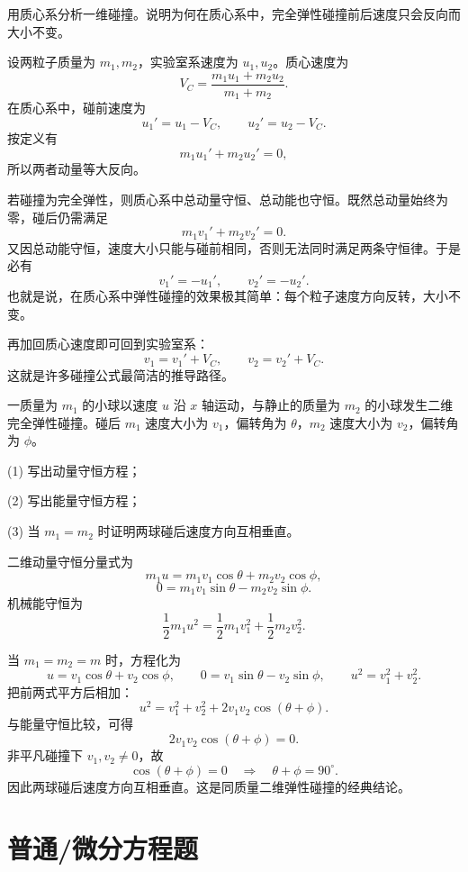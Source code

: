 \begin{university}
用质心系分析一维碰撞。说明为何在质心系中，完全弹性碰撞前后速度只会反向而大小不变。

\begin{solution}
设两粒子质量为 $m_1,m_2$，实验室系速度为 $u_1,u_2$。质心速度为
\[
V_C=\frac{m_1u_1+m_2u_2}{m_1+m_2}.
\]
在质心系中，碰前速度为
\[
u_1'=u_1-V_C,
\qquad
u_2'=u_2-V_C.
\]
按定义有
\[
m_1u_1'+m_2u_2'=0,
\]
所以两者动量等大反向。

若碰撞为完全弹性，则质心系中总动量守恒、总动能也守恒。既然总动量始终为零，碰后仍需满足
\[
m_1v_1'+m_2v_2'=0.
\]
又因总动能守恒，速度大小只能与碰前相同，否则无法同时满足两条守恒律。于是必有
\[
v_1'=-u_1',
\qquad
v_2'=-u_2'.
\]
也就是说，在质心系中弹性碰撞的效果极其简单：每个粒子速度方向反转，大小不变。

再加回质心速度即可回到实验室系：
\[
v_1=v_1'+V_C,
\qquad
v_2=v_2'+V_C.
\]
这就是许多碰撞公式最简洁的推导路径。
\end{solution}
\end{university}

\begin{university}
一质量为 $m_1$ 的小球以速度 $u$ 沿 $x$ 轴运动，与静止的质量为 $m_2$ 的小球发生二维完全弹性碰撞。碰后 $m_1$ 速度大小为 $v_1$，偏转角为 $\theta$，$m_2$ 速度大小为 $v_2$，偏转角为 $\phi$。

(1) 写出动量守恒方程；

(2) 写出能量守恒方程；

(3) 当 $m_1=m_2$ 时证明两球碰后速度方向互相垂直。

\begin{solution}
二维动量守恒分量式为
\[
m_1u=m_1v_1\cos\theta+m_2v_2\cos\phi,
\]
\[
0=m_1v_1\sin\theta-m_2v_2\sin\phi.
\]
机械能守恒为
\[
\frac12 m_1u^2=\frac12 m_1v_1^2+\frac12 m_2v_2^2.
\]

当 $m_1=m_2=m$ 时，方程化为
\[
u=v_1\cos\theta+v_2\cos\phi,
\qquad
0=v_1\sin\theta-v_2\sin\phi,
\qquad
u^2=v_1^2+v_2^2.
\]
把前两式平方后相加：
\[
u^2=v_1^2+v_2^2+2v_1v_2\cos(\theta+\phi).
\]
与能量守恒比较，可得
\[
2v_1v_2\cos(\theta+\phi)=0.
\]
非平凡碰撞下 $v_1,v_2\ne 0$，故
\[
\cos(\theta+\phi)=0
\quad\Rightarrow\quad
\theta+\phi=90^\circ.
\]
因此两球碰后速度方向互相垂直。这是同质量二维弹性碰撞的经典结论。
\end{solution}
\end{university}

\section*{普通/微分方程题}

